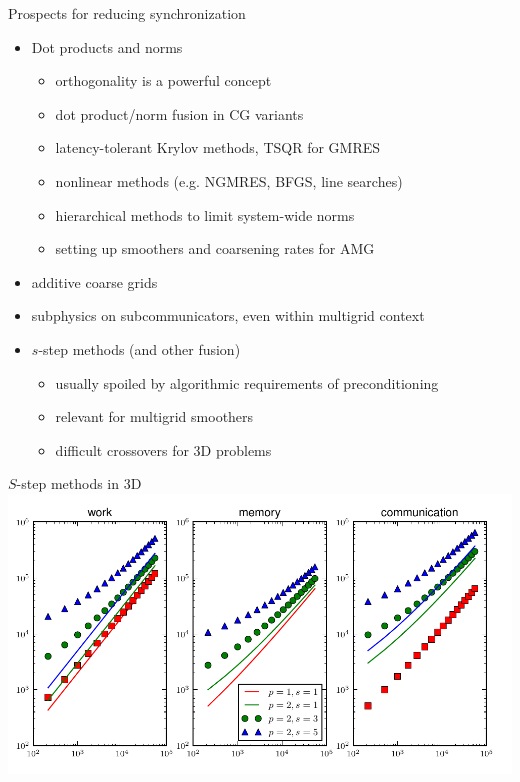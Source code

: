\documentclass{beamer}
\begin{document}
\begin{frame}{Prospects for reducing synchronization}
  \begin{itemize}
  \item Dot products and norms
    \begin{itemize}
    \item orthogonality is a powerful concept
    \item dot product/norm fusion in CG variants
    \item latency-tolerant Krylov methods, TSQR for GMRES
    \item nonlinear methods (e.g. NGMRES, BFGS, line searches)
    \item hierarchical methods to limit system-wide norms
    \item setting up smoothers and coarsening rates for AMG
    \end{itemize}
  \item additive coarse grids
  \item subphysics on subcommunicators, even within multigrid context
  \item $s$-step methods (and other fusion)
    \begin{itemize}
    \item usually spoiled by algorithmic requirements of preconditioning
    \item relevant for multigrid smoothers
    \item difficult crossovers for 3D problems
    \end{itemize}
  \end{itemize}
\end{frame}

\begin{frame}{$S$-step methods in 3D}
  \includegraphics[width=1.1\textwidth]{figures/SStep.pdf}
\end{frame}
\end{document}
